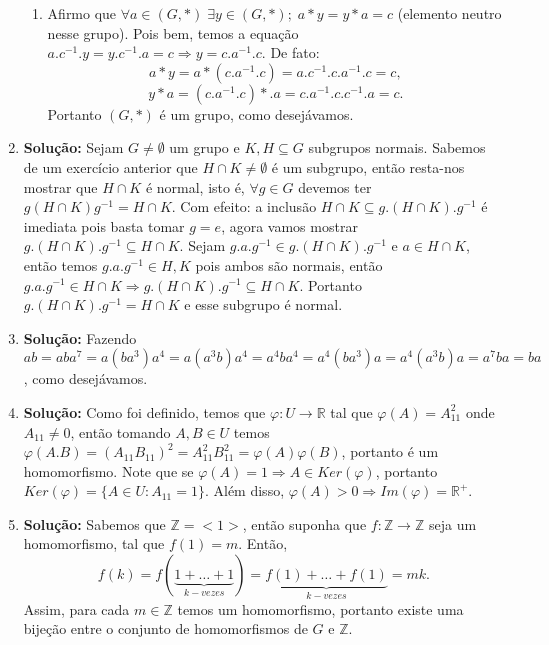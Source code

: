 \documentclass{article}
\begin{document}
\begin{enumerate}
\begin{enumerate}
			\item Afirmo que $\forall a \in (G,*) \; \exists y \in (G,*); \; a*y = y*a = c$ (elemento neutro nesse grupo). Pois bem, temos a equação $a.c^{-1}.y = y.c^{-1}.a = c \Rightarrow y = c.a^{-1}.c$. De fato: 
			$$
			a*y = a*(c.a^{-1}.c) = a.c^{-1}.c.a^{-1}.c = c,
			$$
			$$
			y*a = (c.a^{-1}.c)*.a = c.a^{-1}.c.c^{-1}.a = c.
			$$
			Portanto $(G,*)$ é um grupo, como desejávamos.
		\end{enumerate}
		
		\item \textbf{Solução:} Sejam $G \neq \emptyset$ um grupo e $K,H \subseteq G$ subgrupos normais. Sabemos de um exercício anterior que $H \cap K \neq \emptyset$ é um subgrupo, então resta-nos mostrar que $H \cap K$ é normal, isto é, $\forall g \in G$ devemos ter $g(H \cap K)g^{-1} = H \cap K$. Com efeito: a inclusão $H \cap K \subseteq g.(H \cap K ).g^{-1}$ é imediata pois basta tomar $g = e$, agora vamos mostrar $g.(H \cap K ).g^{-1}\subseteq H \cap K$.  Sejam $g.a.g^{-1} \in g.(H \cap K ).g^{-1}$ e $a \in H \cap K$, então temos $g.a.g^{-1} \in H, K$ pois ambos são normais, então $g.a.g^{-1} \in H \cap K \Rightarrow g.(H \cap K ).g^{-1} \subseteq H \cap K $. Portanto $g.(H \cap K ).g^{-1}= H \cap K$ e esse subgrupo é normal.
		
		\item \textbf{Solução:} Fazendo $ab = aba^{7} = a(ba^{3})a^{4} = a(a^{3}b)a^{4} = a^{4}ba^{4} = a^{4}(ba^{3})a = a^{4}(a^{3}b)a = a^{7}ba = ba$, como desejávamos.
		
		\item \textbf{Solução:} Como foi definido, temos que $\varphi: U \to \mathbb{R}$ tal que $\varphi(A) = A_{11}^{2}$ onde $A_{11} \neq 0$, então tomando $A, B \in U$ temos $\varphi(A.B) = (A_{11}B_{11})^{2} = A_{11}^{2}B_{11}^{2} = \varphi(A)\varphi(B)$, portanto é um homomorfismo. Note que se $\varphi(A)=1 \Rightarrow A \in Ker(\varphi)$, portanto $Ker(\varphi) =\{A \in U: A_{11} = 1\}$. Além disso, $\varphi(A)>0 \Rightarrow Im(\varphi) = \mathbb{R^{+}}$.
		
		\item \textbf{Solução:} Sabemos que $\mathbb{Z} = <1>$, então suponha que $f:\mathbb{Z} \to \mathbb{Z}$ seja um homomorfismo, tal que $f(1)=m$. Então,
		$$
		f(k) = f(\underbrace{1+\dots+1}_{k-vezes})=\underbrace{f(1)+\dots+f(1)}_{k-vezes}= mk.
		$$
		Assim, para cada $m \in \mathbb{Z}$ temos um homomorfismo, portanto existe uma bijeção entre o conjunto de homomorfismos de $G$ e $\mathbb{Z}$.
		

\end{enumerate}
\end{document}
